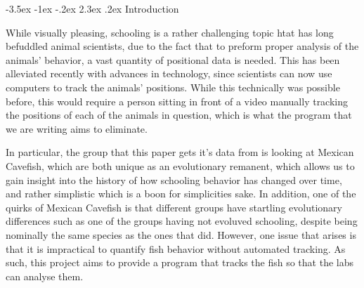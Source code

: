 \documentclass{article}
\makeatletter
\renewcommand\section{\clearpage\newpage\@startsection {section}{1}{\z@}%
	{-3.5ex \@plus -1ex \@minus -.2ex}%
	{2.3ex \@plus.2ex}%
	{\normalfont\Large\bfseries}}
\makeatother
\begin{document}
\singlespace
\newpage

\setlength{\parindent}{1em}



\section{Introduction}
\label{introduction}

While visually pleasing, schooling is a rather challenging topic htat has long befuddled animal scientists, due to the fact that to preform proper analysis of the animals' behavior, a vast quantity of positional data is needed. This has been alleviated recently with advances in technology, since scientists can now use computers to track the animals' positions. While this technically was possible before, this would require a person sitting in front of a video manually tracking the positions of each of the animals in question, which is what the program that we are writing aims to eliminate.

In particular, the group that this paper gets it's data from is looking at Mexican Cavefish, which are both unique as an evolutionary remanent, which allows us to gain insight into the history of how schooling behavior has changed over time, and rather simplistic which is a boon for simplicities sake. In addition, one of the quirks of Mexican Cavefish is that different groups have startling evolutionary differences such as one of the groups having not evoluved schooling, despite being nominally the same species as the ones that did. However, one issue that arises is that it is impractical to quantify fish behavior without automated tracking. As such, this project aims to provide a program that tracks the fish so that the labs can analyse them.
\end{document}
